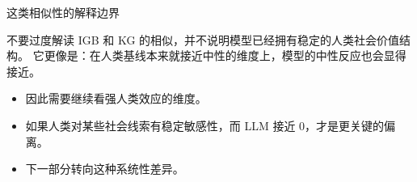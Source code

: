 \begin{frame}{这类相似性的解释边界}
  \begin{alertblock}{不要过度解读}
    IGB 和 KG 的相似，并不说明模型已经拥有稳定的人类社会价值结构。
    它更像是：在人类基线本来就接近中性的维度上，模型的中性反应也会显得接近。
  \end{alertblock}

  \vspace{0.6em}
  \begin{itemize}
    \item 因此需要继续看强人类效应的维度。
    \item 如果人类对某些社会线索有稳定敏感性，而 LLM 接近 0，才是更关键的偏离。
    \item 下一部分转向这种系统性差异。
  \end{itemize}

\end{frame}
